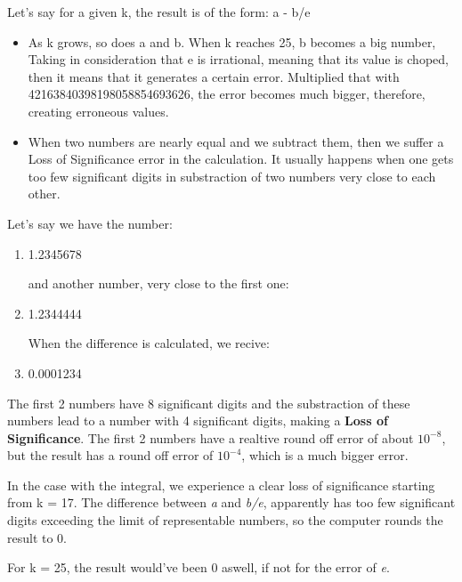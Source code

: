 \documentclass{article}
\begin{document}
	\par Let's say for a given k, the result is of the form: a - b/e

	\begin{itemize}
    	\item As k grows, so does a and b. When k reaches 25, b becomes a big number, Taking in consideration that e is irrational, meaning that its value is choped, then it means that it generates a certain error. Multiplied that with 42163840398198058854693626, the error becomes much bigger, therefore, creating erroneous values.

    	\item When two numbers are nearly equal and we subtract them, then we suffer a Loss of Significance error in the calculation. It usually happens when one gets too few significant digits in substraction of two numbers very close to each other.
	\end{itemize}
	\par Let's say we have the number:
	\begin{enumerate}
		\item \begin{center}
			1.2345678
		\end{center}

		and another number, very close to the first one:
		
		\item \begin{center}
			1.2344444
		\end{center}
		
		When the difference is calculated, we recive:
		
		\item \begin{center}
			0.0001234
		\end{center}
	\end{enumerate}
	\par The first 2 numbers have 8 significant digits and the substraction of these numbers lead to a number with 4 significant digits, making a \textbf{Loss of Significance}. The first 2 numbers have a realtive round off error of about $10^{-8}$, but the result has a round off error of $10 ^ {-4}$, which is a much bigger error.
	\par In the case with the integral, we experience a clear loss of significance starting from k = 17. The difference between \textit{a} and \textit{b/e}, apparently has too few significant digits exceeding the limit of representable numbers, so the computer rounds the result to 0.
	\par For k = 25, the result would've been 0 aswell, if not for the error of \textit{e}.
    \newpage
\end{document}
